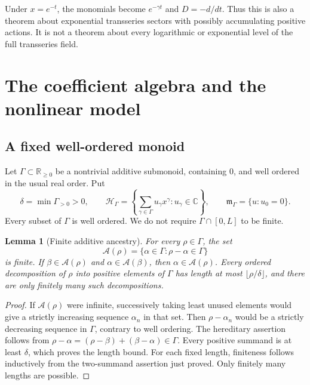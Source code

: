 \documentclass[11pt,a4paper]{article}
\numberwithin{equation}{section}
\newtheorem{lemma}[theorem]{Lemma}
\theoremstyle{definition}
\theoremstyle{remark}
\newcommand{\C}{\mathbb C}
\newcommand{\R}{\mathbb R}
\newcommand{\G}{\Gamma}
\newcommand{\HH}{\mathscr H}
\newcommand{\mm}{\mathfrak m}
\newcommand{\Anc}{\mathcal A}
\begin{document}
Under $x=e^{-t}$, the monomials become $e^{-\gamma t}$ and $D=-d/dt$.
Thus this is also a theorem about exponential transseries sectors with
possibly accumulating positive actions. It is not a theorem about every
logarithmic or exponential level of the full transseries field.

\section{The coefficient algebra and the nonlinear model}
\label{sec:framework}

\subsection{A fixed well-ordered monoid}
Let $\G\subset\R_{\geq0}$ be a nontrivial additive submonoid, containing
$0$, and well ordered in the usual real order. Put
\begin{equation}\label{eq:delta}
 \delta=\min\G_{>0}>0,
 \qquad
 \HH_\G=\left\{\sum_{\gamma\in\G}u_\gamma x^\gamma:
 u_\gamma\in\C\right\},
 \qquad
 \mm_\G=\{u:u_0=0\}.
\end{equation}
Every subset of $\G$ is well ordered. We do not require
$\G\cap[0,L]$ to be finite.

\begin{lemma}[Finite additive ancestry]\label{lem:ancestry}
For every $\rho\in\G$, the set
\begin{equation}\label{eq:ancestors}
 \Anc(\rho)=\{\alpha\in\G:\rho-\alpha\in\G\}
\end{equation}
is finite. If $\beta\in\Anc(\rho)$ and
$\alpha\in\Anc(\beta)$, then $\alpha\in\Anc(\rho)$.
Every ordered decomposition of $\rho$ into positive elements of $\G$
has length at most $\lfloor\rho/\delta\rfloor$, and there are only
finitely many such decompositions.
\end{lemma}
\begin{proof}
If $\Anc(\rho)$ were infinite, successively taking least unused elements
would give a strictly increasing sequence $\alpha_n$ in that set. Then
$\rho-\alpha_n$ would be a strictly decreasing sequence in $\G$, contrary
to well ordering. The hereditary assertion follows from
$\rho-\alpha=(\rho-\beta)+(\beta-\alpha)\in\G$.
Every positive summand is at least $\delta$, which proves the length bound.
For each fixed length, finiteness follows inductively from the two-summand
assertion just proved. Only finitely many lengths are possible.
\end{proof}
\end{document}

